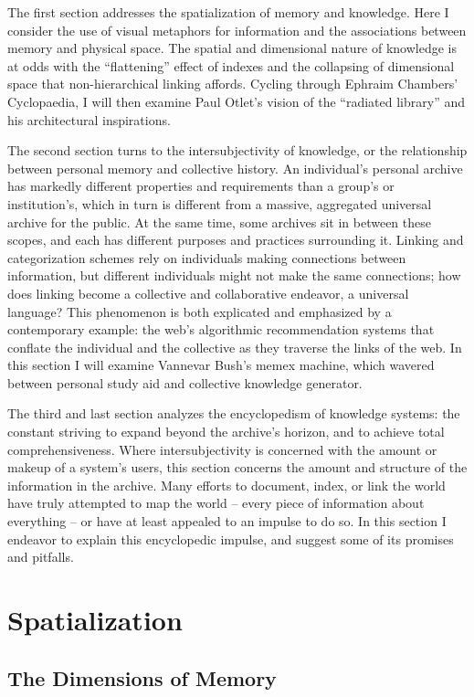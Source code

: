 The first section addresses the spatialization of memory and knowledge. Here I consider the use of visual metaphors for information and the associations between memory and physical space. The spatial and dimensional nature of knowledge is at odds with the “flattening” effect of indexes and the collapsing of dimensional space that non-hierarchical linking affords. Cycling through Ephraim Chambers’ Cyclopaedia, I will then examine Paul Otlet’s vision of the “radiated library” and his architectural inspirations.

The second section turns to the intersubjectivity of knowledge, or the relationship between personal memory and collective history. An individual’s personal archive has markedly different properties and requirements than a group’s or institution’s, which in turn is different from a massive, aggregated universal archive for the public. At the same time, some archives sit in between these scopes, and each has different purposes and practices surrounding it. Linking and categorization schemes rely on individuals making connections between information, but different individuals might not make the same connections; how does linking become a collective and collaborative endeavor, a universal language? This phenomenon is both explicated and emphasized by a contemporary example: the web’s algorithmic recommendation systems that conflate the individual and the collective as they traverse the links of the web. In this section I will examine Vannevar Bush’s memex machine, which wavered between personal study aid and collective knowledge generator.

The third and last section analyzes the encyclopedism of knowledge systems: the constant striving to expand beyond the archive’s horizon, and to achieve total comprehensiveness. Where intersubjectivity is concerned with the amount or makeup of a system’s users, this section concerns the amount and structure of the information in the archive. Many efforts to document, index, or link the world have truly attempted to map the world – every piece of information about everything – or have at least appealed to an impulse to do so. In this section I endeavor to explain this encyclopedic impulse, and suggest some of its promises and pitfalls.

\section{Spatialization}

\subsection{The Dimensions of Memory}

